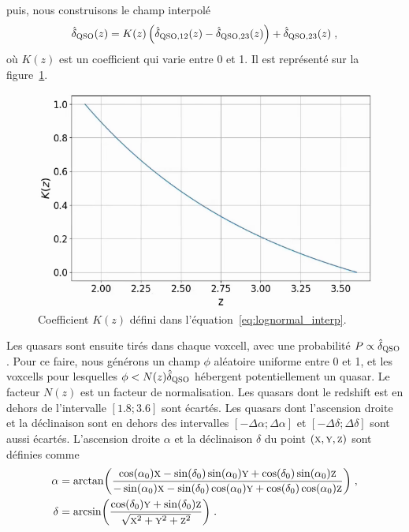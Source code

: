 \documentclass[11pt, twoside, a4paper, openright]{report}
\begin{document}
puis, nous construisons le champ interpolé
\begin{equation}
  \label{eq:lognormal_interp}
 \hat \delta_{\textsc{QSO}}(z) = K(z) \left(\hat \delta_{\textsc{QSO}, 12}(z) - \hat \delta_{\textsc{QSO}, 23}(z)\right) + \hat \delta_{\textsc{QSO}, 23}(z) \; ,
\end{equation}
où $K(z)$ est un coefficient qui varie entre 0 et 1. Il est représenté sur la figure~\ref{fig:kz}.
\begin{figure}
  \centering
  \label{fig:kz}
  \includegraphics[scale=0.4]{kz}
  \caption{Coefficient $K(z)$ défini dans l'équation~\ref{eq:lognormal_interp}.}
\end{figure}
Les quasars sont ensuite tirés dans chaque voxcell, avec une probabilité $P \propto \hat \delta_{\textsc{QSO}}$. Pour ce faire, nous générons un champ $\phi$ aléatoire uniforme entre 0 et 1, et les voxcells pour lesquelles $\phi < N(z) \hat \delta_{\textsc{QSO}}$ hébergent potentiellement un quasar. Le facteur $N(z)$ est un facteur de normalisation. Les quasars dont le redshift est en dehors de l'intervalle $[\num{1.8}; \num{3.6}]$ sont écartés.
Les quasars dont l'ascension droite et la déclinaison sont en dehors des intervalles $[ - \Delta \alpha ; \Delta \alpha]$ et $[ - \Delta \delta ; \Delta \delta]$ sont aussi écartés.
L'ascension droite $\alpha$ et la déclinaison $\delta$ du point $(\textsc{x},\textsc{y},\textsc{z})$ sont définies comme
\begin{align}
  \label{eq:radec}
  \alpha &= \arctan(\frac{
  \cos(\alpha_0)\textsc{x} - \sin(\delta_0)\sin(\alpha_0)\textsc{y} + \cos(\delta_0)\sin(\alpha_0)\textsc{z}
  }{
  - \sin(\alpha_0)\textsc{x} - \sin(\delta_0)\cos(\alpha_0)\textsc{y} + \cos(\delta_0)\cos(\alpha_0)\textsc{z}
           }) \; ,\\
  \delta &= \arcsin(\frac{
           \cos(\delta_0)\textsc{y} + \sin(\delta_0) \textsc{z}
           }{
           \sqrt{\textsc{x}^2 + \textsc{y}^2 + \textsc{z}^2}
           }) \; .
\end{align}
\end{document}
